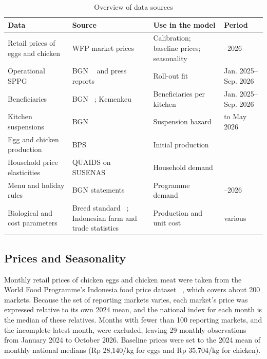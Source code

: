 \documentclass[10pt,twocolumn,a4paper]{article}
\begin{document}
\begin{table}[!htb]
\centering
\scriptsize
\caption{Overview of data sources}\label{tab:data}
\begin{tabularx}{\linewidth}{>{\raggedright\arraybackslash}p{2.2cm}>{\raggedright\arraybackslash}X>{\raggedright\arraybackslash}p{1.9cm}>{\raggedright\arraybackslash}p{1.3cm}}
\toprule
\textbf{Data} & \textbf{Source} & \textbf{Use in the model} & \textbf{Period} \\
\midrule
Retail prices of eggs and chicken & WFP market prices ~\cite{wfp} & Calibration; baseline prices; seasonality & 2007--2026 \\
Operational SPPG & BGN ~\cite{bgn2025,bgnaug2025} and press reports ~\cite{sppgpress} & Roll-out fit & Jan. 2025--Sep. 2026 \\
Beneficiaries & BGN ~\cite{bgn2025,antara2026,bgnaug2025}; Kemenkeu ~\cite{sppgpress} & Beneficiaries per kitchen & Jan. 2025--Sep. 2026 \\
Kitchen suspensions & BGN & Suspension hazard & to May 2026 \\
Egg and chicken production & BPS ~\cite{bpsprod} & Initial production & 2024 \\
Household price elasticities & QUAIDS on SUSENAS ~\cite{khoiriyah2024} & Household demand & 2021 \\
Menu and holiday rules & BGN statements ~\cite{bgnegg2025,egg3x2026,holiday2026} & Programme demand & 2025--2026 \\
Biological and cost parameters & Breed standard ~\cite{lohmann}; Indonesian farm and trade statistics & Production and unit cost & various \\
\bottomrule
\end{tabularx}
\end{table}

\subsection{Prices and Seasonality}\label{sec:seas}

Monthly retail prices of chicken eggs and chicken meat were taken from the World Food Programme's Indonesia food price dataset ~\cite{wfp}, which covers about 200 markets. Because the set of reporting markets varies, each market's price was expressed relative to its own 2024 mean, and the national index for each month is the median of these relatives. Months with fewer than 100 reporting markets, and the incomplete latest month, were excluded, leaving 29 monthly observations from January 2024 to October 2026. Baseline prices were set to the 2024 mean of monthly national medians (Rp 28,140/kg for eggs and Rp 35,704/kg for chicken).
\end{document}
